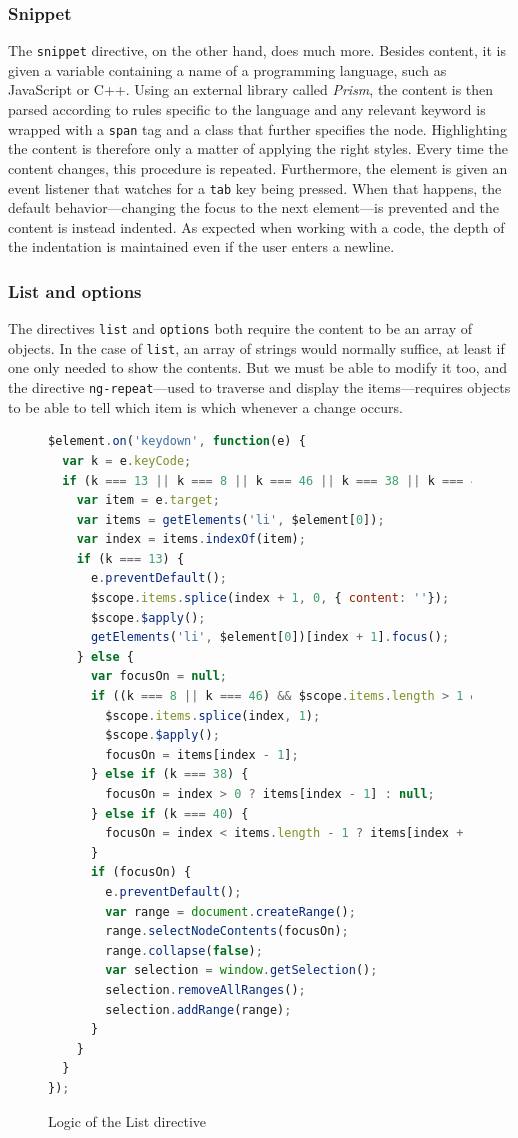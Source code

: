 \documentclass[thesis=M,english,hidelinks]{FITthesis}[2012/10/20]
\newcommand{\code}{\texttt}
\begin{document}
      \subsubsection{Snippet}

The \code{snippet} directive, on the other hand, does much more. Besides content, it is given a variable containing a name of a programming language, such as JavaScript or C++. Using an external library called \textit{Prism}, the content is then parsed according to rules specific to the language and any relevant keyword is wrapped with a \code{span} tag and a class that further specifies the node. Highlighting the content is therefore only a matter of applying the right styles. Every time the content changes, this procedure is repeated. Furthermore, the element is given an event listener that watches for a \code{tab} key being pressed. When that happens, the default behavior---changing the focus to the next element---is prevented and the content is instead indented. As expected when working with a code, the depth of the indentation is maintained even if the user enters a newline.

      \subsubsection{List and options}

The directives \code{list} and \code{options} both require the content to be an array of objects. In the case of \code{list}, an array of strings would normally suffice, at least if one only needed to show the contents. But we must be able to modify it too, and the directive \code{ng-repeat}---used to traverse and display the items---requires objects to be able to tell which item is which whenever a change occurs.

\begin{figure}[h]
  \begin{lstlisting}[language=JavaScript]
$element.on('keydown', function(e) {
  var k = e.keyCode;
  if (k === 13 || k === 8 || k === 46 || k === 38 || k === 40) {
    var item = e.target;
    var items = getElements('li', $element[0]);
    var index = items.indexOf(item);
    if (k === 13) {
      e.preventDefault();
      $scope.items.splice(index + 1, 0, { content: ''});
      $scope.$apply();
      getElements('li', $element[0])[index + 1].focus();
    } else {
      var focusOn = null;
      if ((k === 8 || k === 46) && $scope.items.length > 1 && !$scope.items[index].content) {
        $scope.items.splice(index, 1);
        $scope.$apply();
        focusOn = items[index - 1];
      } else if (k === 38) {
        focusOn = index > 0 ? items[index - 1] : null;
      } else if (k === 40) {
        focusOn = index < items.length - 1 ? items[index + 1] : null;
      }
      if (focusOn) {
        e.preventDefault();
        var range = document.createRange();
        range.selectNodeContents(focusOn);
        range.collapse(false);
        var selection = window.getSelection();
        selection.removeAllRanges();
        selection.addRange(range);
      }
    }
  }
});
  \end{lstlisting}
  \caption{Logic of the List directive}
  \label{fig:list_directive}
\end{figure}
\end{document}
